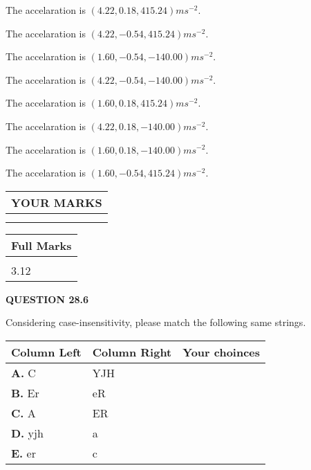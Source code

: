 \documentclass[12pt]{article}
\begin{document}
  
 
 
The accelaration is $  %
(
4.22,
0.18,
415.24)
ms^{-2} $.
 
 
The accelaration is $  %
(
4.22,
-0.54,
415.24)
ms^{-2} $.
 
 
The accelaration is $  %
(
1.60,
-0.54,
-140.00)
ms^{-2} $.
 
 
The accelaration is $  %
(
4.22,
-0.54,
-140.00)
ms^{-2} $.
 
 
The accelaration is $  %
(
1.60,
0.18,
415.24)
ms^{-2} $.
 
 
The accelaration is $  %
(
4.22,
0.18,
-140.00)
ms^{-2} $.
 
 
The accelaration is $  %
(
1.60,
0.18,
-140.00)
ms^{-2} $.
 
 
The accelaration is $  %
(
1.60,
-0.54,
415.24)
ms^{-2} $.
 
 
 

 

 
\vspace{0.3in}
  
\vspace{0.2in}
  
\noindent\begin{tabular}{|l|}
\hline
 YOUR MARKS  \\
\hline
 \\ 
 \\ 
\hline
\end{tabular}
\hspace{0.05in} \begin{tabular}{|l|}
\hline
 Full Marks  \\
\hline
 \\ 
3.12 \\
\hline
\end{tabular}
{\textbf{\Large{QUESTION
28.6 
}}}
  
  
Considering case-insensitivity, please match the following same strings.
  
  
\begin{tabular}{|l|l|l|}
 \hline
 Column Left & Column Right  & Your choinces \\ 
 \hline
{\textbf{\large{
A.}}}
C
  & 
YJH
 & 
 \\ 
 \hline
{\textbf{\large{
B.}}}
Er
  & 
eR
 & 
 \\ 
 \hline
{\textbf{\large{
C.}}}
A
  & 
ER
 & 
 \\ 
 \hline
{\textbf{\large{
D.}}}
yjh
  & 
a
 & 
 \\ 
 \hline
{\textbf{\large{
E.}}}
er
  & 
c
 & 
 \\ 
 \hline
 \end{tabular}
  
\end{document}
